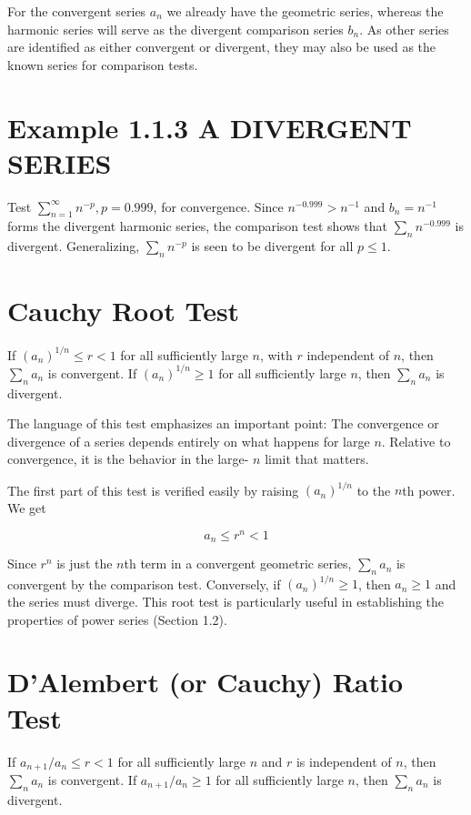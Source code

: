 \documentclass[10pt]{article}
\begin{document}
For the convergent series $a_{n}$ we already have the geometric series, whereas the harmonic series will serve as the divergent comparison series $b_{n}$. As other series are identified as either convergent or divergent, they may also be used as the known series for comparison tests.

\section*{Example 1.1.3 A DIVERGENT SERIES}
Test $\sum_{n=1}^{\infty} n^{-p}, p=0.999$, for convergence. Since $n^{-0.999}>n^{-1}$ and $b_{n}=n^{-1}$ forms the divergent harmonic series, the comparison test shows that $\sum_{n} n^{-0.999}$ is divergent. Generalizing, $\sum_{n} n^{-p}$ is seen to be divergent for all $p \leq 1$.

\section*{Cauchy Root Test}
If $\left(a_{n}\right)^{1 / n} \leq r<1$ for all sufficiently large $n$, with $r$ independent of $n$, then $\sum_{n} a_{n}$ is convergent. If $\left(a_{n}\right)^{1 / n} \geq 1$ for all sufficiently large $n$, then $\sum_{n} a_{n}$ is divergent.

The language of this test emphasizes an important point: The convergence or divergence of a series depends entirely on what happens for large $n$. Relative to convergence, it is the behavior in the large- $n$ limit that matters.

The first part of this test is verified easily by raising $\left(a_{n}\right)^{1 / n}$ to the $n$th power. We get

$$
a_{n} \leq r^{n}<1
$$

Since $r^{n}$ is just the $n$th term in a convergent geometric series, $\sum_{n} a_{n}$ is convergent by the comparison test. Conversely, if $\left(a_{n}\right)^{1 / n} \geq 1$, then $a_{n} \geq 1$ and the series must diverge. This root test is particularly useful in establishing the properties of power series (Section 1.2).

\section*{D'Alembert (or Cauchy) Ratio Test}
If $a_{n+1} / a_{n} \leq r<1$ for all sufficiently large $n$ and $r$ is independent of $n$, then $\sum_{n} a_{n}$ is convergent. If $a_{n+1} / a_{n} \geq 1$ for all sufficiently large $n$, then $\sum_{n} a_{n}$ is divergent.
\end{document}
